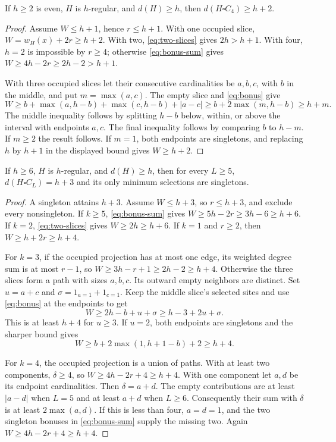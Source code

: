\begin{lemma}\label{lem:four}
If $h\ge2$ is even, $H$ is $h$-regular, and $d(H)\ge h$, then $d(H\square C_4)\ge h+2$.
\end{lemma}
\begin{proof}
Assume $W\le h+1$, hence $r\le h+1$. With one occupied slice, $W=w_H(x)+2r\ge h+2$. With two, \eqref{eq:two-slices} gives $2h>h+1$. With four, $h=2$ is impossible by $r\ge4$; otherwise \eqref{eq:bonus-sum} gives $W\ge4h-2r\ge2h-2>h+1$.

With three occupied slices let their consecutive cardinalities be $a,b,c$, with $b$ in the middle, and put $m=\max(a,c)$. The empty slice and \eqref{eq:bonus} give
\[
 W\ge b+\max(a,h-b)+\max(c,h-b)+|a-c|
 \ge b+2\max(m,h-b)\ge h+m.
\]
The middle inequality follows by splitting $h-b$ below, within, or above the interval with endpoints $a,c$. The final inequality follows by comparing $b$ to $h-m$. If $m\ge2$ the result follows. If $m=1$, both endpoints are singletons, and replacing $h$ by $h+1$ in the displayed bound gives $W\ge h+2$.
\end{proof}

\begin{lemma}\label{lem:long}
If $h\ge6$, $H$ is $h$-regular, and $d(H)\ge h$, then for every $L\ge5$, $d(H\square C_L)=h+3$ and its only minimum selections are singletons.
\end{lemma}
\begin{proof}
A singleton attains $h+3$. Assume $W\le h+3$, so $r\le h+3$, and exclude every nonsingleton. If $k\ge5$, \eqref{eq:bonus-sum} gives $W\ge5h-2r\ge3h-6\ge h+6$. If $k=2$, \eqref{eq:two-slices} gives $W\ge2h\ge h+6$. If $k=1$ and $r\ge2$, then $W\ge h+2r\ge h+4$.

For $k=3$, if the occupied projection has at most one edge, its weighted degree sum is at most $r-1$, so $W\ge3h-r+1\ge2h-2\ge h+4$. Otherwise the three slices form a path with sizes $a,b,c$. Its outward empty neighbors are distinct. Set $u=a+c$ and $\sigma=1_{a=1}+1_{c=1}$. Keep the middle slice's selected sites and use \eqref{eq:bonus} at the endpoints to get
\[
 W\ge2h-b+u+\sigma\ge h-3+2u+\sigma.
\]
This is at least $h+4$ for $u\ge3$. If $u=2$, both endpoints are singletons and the sharper bound gives
\[
 W\ge b+2\max(1,h+1-b)+2\ge h+4.
\]

For $k=4$, the occupied projection is a union of paths. With at least two components, $\delta\ge4$, so $W\ge4h-2r+4\ge h+4$. With one component let $a,d$ be its endpoint cardinalities. Then $\delta=a+d$. The empty contributions are at least $|a-d|$ when $L=5$ and at least $a+d$ when $L\ge6$. Consequently their sum with $\delta$ is at least $2\max(a,d)$. If this is less than four, $a=d=1$, and the two singleton bonuses in \eqref{eq:bonus-sum} supply the missing two. Again $W\ge4h-2r+4\ge h+4$.
\end{proof}

